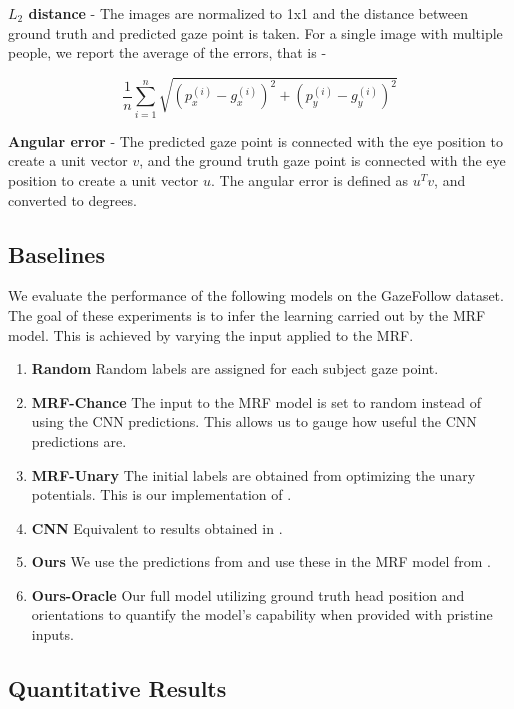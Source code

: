 \documentclass[10pt,twocolumn,letterpaper]{article}
\begin{document}
\textbf{$L_2$ distance} - The images are normalized to 1x1 and the distance between ground truth and predicted gaze point is taken. For a single image with multiple people, we report the average of the errors, that is -

\begin{equation}
\frac{1}{n} \sum_{i=1}^n \sqrt{(p_x^{(i)} - g_x^{(i)})^2 + (p_y^{(i)} - g_y^{(i)})^2}
\end{equation}

\textbf{Angular error} - The predicted gaze point is connected with the eye position to create a unit vector $v$, and the ground truth gaze point is connected with the eye position to create a unit vector $u$. The angular error is defined as $u^T v$, and converted to degrees.

\subsection{Baselines}

We evaluate the performance of the following models on the GazeFollow \cite{nips15_recasens} dataset. The goal of these experiments is to infer the learning carried out by the MRF model. This is achieved by varying the input applied to the MRF.

\begin{enumerate}[wide, labelwidth=!, labelindent=0pt, itemsep=0em]
  \item \textbf{Random} Random labels are assigned for each subject gaze point.
  \item \textbf{MRF-Chance} The input to the MRF model is set to random instead of using the CNN predictions. This allows us to gauge how useful the CNN predictions are.
  \item \textbf{MRF-Unary} The initial labels are obtained from optimizing the unary potentials. This is our implementation of \cite{fathi2012social}.
  \item \textbf{CNN} Equivalent to results obtained in \cite{nips15_recasens}.
  \item \textbf{Ours} We use the predictions from \cite{nips15_recasens} and use these in the MRF model from \cite{fathi2012social}.
  \item \textbf{Ours-Oracle} Our full model utilizing ground truth head position and orientations to quantify the model’s capability when provided with pristine inputs.
\end{enumerate}

\subsection{Quantitative Results}
\end{document}
